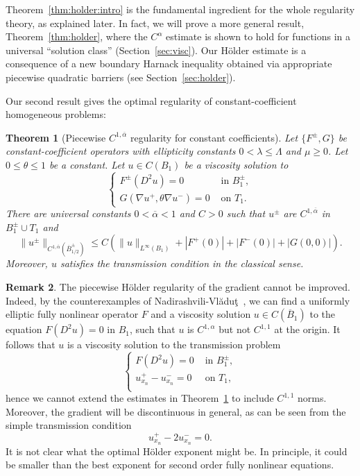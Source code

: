 \documentclass[letter,11pt]{amsart}
\newtheorem{thm}{Theorem}[section]
\theoremstyle{definition}
\newtheorem{rem}[thm]{Remark}
\numberwithin{equation}{section}
\begin{document}
Theorem~\ref{thm:holder:intro} is the fundamental ingredient for the whole regularity theory, as explained later.
In fact, we will prove a more general result, Theorem~\ref{thm:holder}, where the $C^{\alpha}$ estimate is shown to hold for functions in a universal ``solution class'' (Section~\ref{sec:visc}).
Our H\"{o}lder estimate is a consequence of a new boundary Harnack inequality obtained via appropriate piecewise quadratic barriers (see Section~\ref{sec:holder}). 

\medskip

Our second result gives the optimal regularity of constant-coefficient homogeneous problems:

\begin{thm}
[Piecewise $C^{1,\overline{\alpha}}$ regularity for constant coefficients]
\label{thm:piecewise}
Let $\{F^{\pm}, G\}$ be constant-coefficient operators with ellipticity constants $0 < \lambda \leq \Lambda$ and $\mu \geq 0$.
Let $0 \leq \theta \leq 1$ be a constant.
Let $u \in C(B_1)$ be a viscosity solution to 
\[
\begin{cases}
F^{\pm}(D^2u) = 0 & \text{ in } B_1^{\pm},\\
G(\nabla u^{+}, \theta \nabla u^{-}) =0 & \text{ on } T_1.
\end{cases}
\]
There are universal constants $0 < \overline{\alpha} < 1$ and $C > 0$ such that
$u^{\pm}$ are $C^{1,\overline{\alpha}}$ in $B_1^{\pm} \cup T_1$ and
\[
\|u^{\pm}\|_{C^{1,\overline{\alpha}}(\overline{B}^{\pm}_{1/2})} 
\leq C \left( \|u\|_{L^{\infty}(B_1)} + |F^{+}(0)| + |F^{-}(0)| + |G(0,0)|
\right).
\]
Moreover, $u$ satisfies the transmission condition in the classical sense.
\end{thm}

\begin{rem}
The piecewise H\"{o}lder regularity of the gradient cannot be improved.
Indeed, by the counterexamples of Nadirashvili-Vl\u adu\c t~\cite{NV1,NV2}, we can find a uniformly elliptic fully nonlinear operator $F$ and a viscosity solution $u \in C(\overline{B}_1)$ to the equation $F(D^2 u) = 0$ in $B_1$, such that $u$ is $C^{1,\alpha}$ but not $C^{1,1}$ at the origin.
It follows that $u$ is a viscosity solution to the transmission problem
\[
\begin{cases}
F(D^2 u) = 0 & \text{ in } B_1^{\pm},\\
u_{x_n}^{+}- u_{x_n}^{-} = 0 & \text{ on } T_1,\\
\end{cases}
\]
hence we cannot extend the estimates in Theorem~\ref{thm:piecewise} to include $C^{1,1}$ norms.
Moreover, the gradient will be discontinuous in general, as can be seen from the simple transmission condition 
\[
u_{x_n}^{+} - 2 u_{x_n}^{-} = 0.
\]
It is not clear what the optimal H\"{o}lder exponent might be.
In principle, it could be smaller than the best exponent for second order fully nonlinear equations.
\end{rem}
\end{document}
